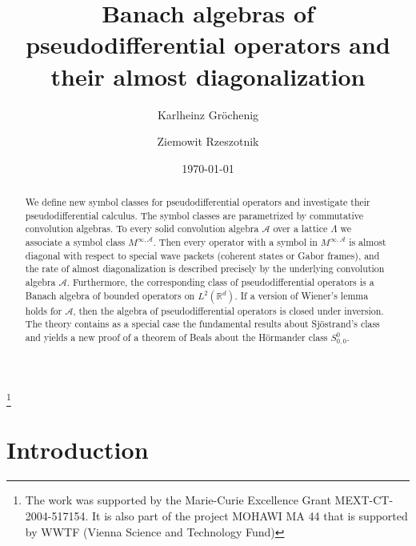 \documentclass[12pt]{amsart}
\theoremstyle{definition}
\theoremstyle{remark}
\numberwithin{equation}{section}
\newcommand{\psdo}{pseudodifferential operator}
\def\cA{\mathcal{A}}
\def\bR{{\mathbb{R}}}
\def\rd{\bR^d}
\def\lrd{L^2(\rd)}
\def\cA{\mathcal{A}}
\begin{document}
\title[Banach algebras of pseudodifferential operators]
{Banach algebras of pseudodifferential operators and their almost
diagonalization}

\author{Karlheinz Gr\"ochenig}


\address{ Numerical Harmonic
Analysis Group, Faculty of Mathematics, UNIVERSITY of VIENNA,
Nordbergstrasse 15, A-1090 Wien, Austria}


\author{Ziemowit Rzeszotnik}

\address{Mathematical Institute, University of Wroclaw,
Pl.~Grunwaldzki 2/4, 50-384 Wroclaw, Poland}


\thanks{The work was supported by the Marie-Curie Excellence Grant
MEXT-CT-2004-517154. It is also part of the  project MOHAWI MA 44
that
is supported by  WWTF (Vienna Science and Technology
Fund)}

\date{\today}
\begin{abstract}
We define new symbol classes for \psdo s and investigate their
pseudodifferential calculus. The symbol classes are parametrized
by
commutative convolution algebras. To every solid
convolution algebra $\cA $ over a lattice  $\Lambda $ we associate
a symbol class
$M^{\infty , \cA } $.
Then  every operator with a symbol in $M^{\infty ,\cA } $ is
almost diagonal with respect to special wave packets (coherent
states
or Gabor frames),  and the rate of almost diagonalization is described
precisely by the underlying convolution algebra $\cA $.
Furthermore,  the corresponding class of \psdo s  is a
Banach algebra of bounded operators on $\lrd $. If a version of
Wiener's lemma holds for $\cA $, then
the algebra of \psdo s is closed under inversion.
The theory contains as a special case the fundamental  results
about
Sj\"ostrand's class and yields a new proof of a theorem of Beals about
the H\"ormander class $S^0_{0,0}$. 
\end{abstract}
\maketitle




\section{Introduction}
\end{document}
